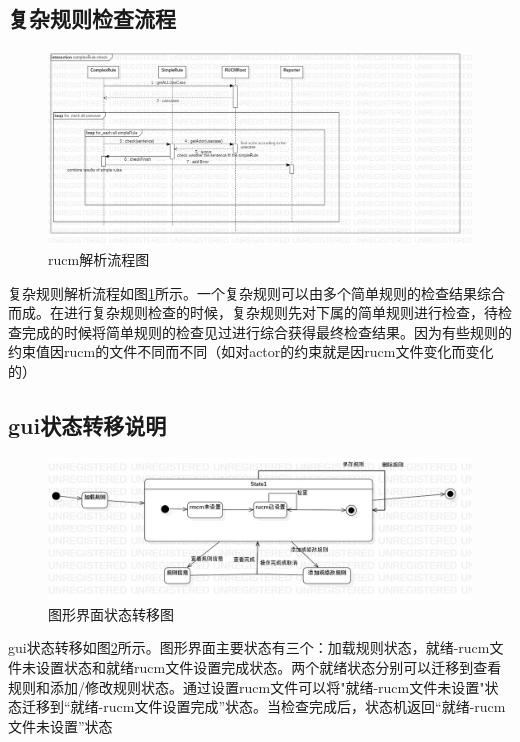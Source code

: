 \subsection{复杂规则检查流程}
	\begin{figure}
	\centering
	\includegraphics[width=1\textwidth]{src/sequence_complexCheck.jpg} 
	\caption{rucm解析流程图} 
	\label{sequence_complexCheck}
	\end{figure}
	复杂规则解析流程如图\ref{sequence_complexCheck}所示。一个复杂规则可以由多个简单规则的检查结果综合而成。在进行复杂规则检查的时候，复杂规则先对下属的简单规则进行检查，待检查完成的时候将简单规则的检查见过进行综合获得最终检查结果。因为有些规则的约束值因rucm的文件不同而不同（如对actor的约束就是因rucm文件变化而变化的）

\subsection{gui状态转移说明}
	\begin{figure}
	\centering
	\includegraphics[width=1\textwidth]{src/stateDisgram_gui.jpg} 
	\caption{图形界面状态转移图} 
	\label{stateDisgram_gui}
	\end{figure}
	gui状态转移如图\ref{stateDisgram_gui}所示。图形界面主要状态有三个：加载规则状态，就绪-rucm文件未设置状态和就绪rucm文件设置完成状态。两个就绪状态分别可以迁移到查看规则和添加/修改规则状态。通过设置rucm文件可以将"就绪-rucm文件未设置"状态迁移到“就绪-rucm文件设置完成”状态。当检查完成后，状态机返回“就绪-rucm文件未设置”状态
	
